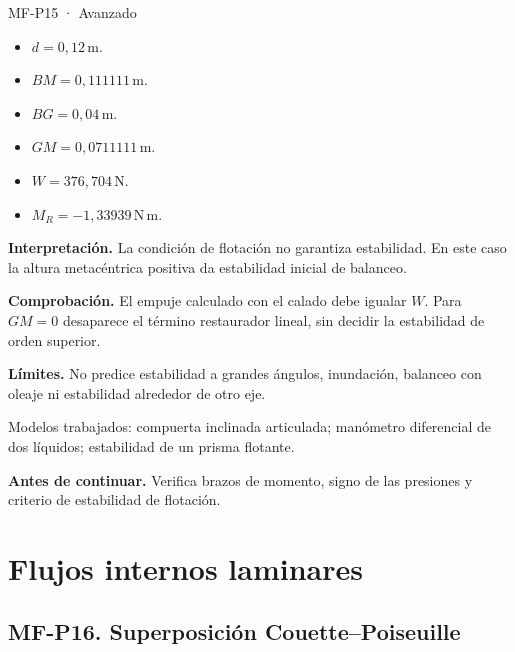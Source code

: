 \begin{studiumworked}{MF-P15 · Avanzado}
\begin{itemize}
\item $d=0{,}12\,\mathrm{m}$.

\item $BM=0{,}111111\,\mathrm{m}$.

\item $BG=0{,}04\,\mathrm{m}$.

\item $GM=0{,}0711111\,\mathrm{m}$.

\item $W=376{,}704\,\mathrm{N}$.

\item $M_R=-1{,}33939\,\mathrm{N\,m}$.

\end{itemize}

\textbf{Interpretación.} La condición de flotación no garantiza estabilidad. En este caso la altura metacéntrica positiva da estabilidad inicial de balanceo.

\textbf{Comprobación.} El empuje calculado con el calado debe igualar $W$. Para $GM=0$ desaparece el término restaurador lineal, sin decidir la estabilidad de orden superior.

\textbf{Límites.} No predice estabilidad a grandes ángulos, inundación, balanceo con oleaje ni estabilidad alrededor de otro eje.

\end{studiumworked}



\begin{tcolorbox}[studiumcheck,breakable=false,title={Síntesis y comprobación}]Modelos trabajados: compuerta inclinada articulada; manómetro diferencial de dos líquidos; estabilidad de un prisma flotante.\par\textbf{Antes de continuar.} Verifica brazos de momento, signo de las presiones y criterio de estabilidad de flotación.\end{tcolorbox}

\chapter{Flujos internos laminares}


\Needspace{.30\textheight}\section{MF-P16. Superposición Couette--Poiseuille}

